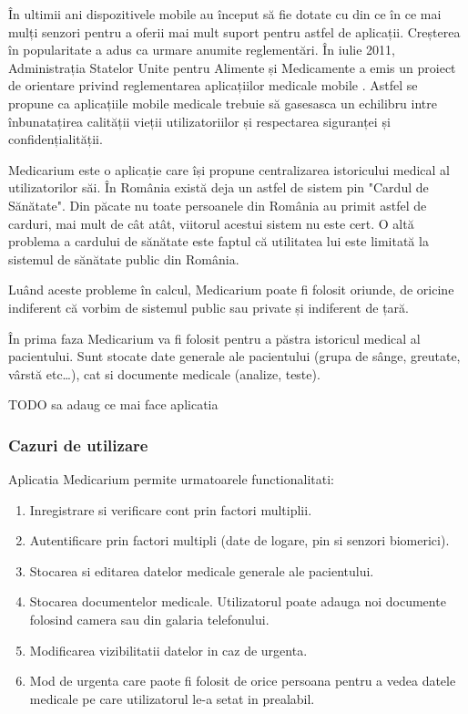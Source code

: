 \documentclass[12pt]{article}
\begin{document}
În ultimii ani dispozitivele mobile au început să fie dotate cu din ce în ce mai mulți
senzori pentru a oferii mai mult suport pentru astfel de aplicații. Creșterea în popularitate a adus ca urmare anumite reglementări.
În iulie 2011, Administrația Statelor Unite pentru Alimente și Medicamente a emis un proiect de orientare privind 
reglementarea aplicațiilor medicale mobile \cite{barton2012regulation}. Astfel se propune ca aplicațiile
mobile medicale trebuie să gasesasca un echilibru intre înbunatațirea calității vieții utilizatoriilor și 
respectarea siguranței și confidențialității.


Medicarium este o aplicație care își propune centralizarea istoricului medical al utilizatorilor săi.
În România există deja un astfel de sistem pin "Cardul de Sănătate". Din păcate nu toate persoanele din România 
au primit astfel de carduri, mai mult de cât atât, viitorul acestui sistem nu este cert. O altă problema a cardului
de sănătate este faptul că utilitatea lui este limitată la sistemul de sănătate public
din România.

Luând aceste probleme în calcul, Medicarium poate fi folosit oriunde, de oricine indiferent
că vorbim de sistemul public sau private și indiferent de țară.

În prima faza Medicarium va fi folosit pentru a păstra istoricul medical al pacientului. 
Sunt stocate date generale ale pacientului (grupa de sânge, greutate, vârstă etc\dots), 
cat si documente medicale (analize, teste).


TODO sa adaug ce mai face aplicatia


\newpage
\subsubsection{Cazuri de utilizare}

Aplicatia Medicarium permite urmatoarele functionalitati:

\begin{enumerate}
    \item Inregistrare si verificare cont prin factori multiplii.
    \item Autentificare prin factori multipli (date de logare, pin si senzori biomerici).
    \item Stocarea si editarea datelor medicale generale ale pacientului.
    \item Stocarea documentelor medicale. Utilizatorul poate adauga noi documente 
    folosind camera sau din galaria telefonului.
    \item Modificarea vizibilitatii datelor in caz de urgenta.
    \item Mod de urgenta care paote fi folosit de orice persoana pentru a vedea
    datele medicale pe care utilizatorul le-a setat in prealabil. 
\end{enumerate}
\end{document}
